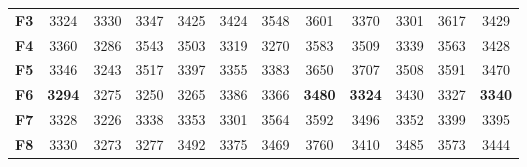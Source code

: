 \documentclass[runningheads]{llncs}
\begin{document}
\begin{table}[bt]
\begin{center}
\begin{tabular}{|l|c|c|c|c|c|c|c|c|c|c|c|}
      \textbf{F3}          & 3324                           & 3330                           & 3347                           & 3425 & 3424                           & 3548                           & 3601                           & 3370 & 3301                           & 3617 & 3429 \\
      \textbf{F4}          & 3360                           & 3286                           & 3543                           & 3503 & 3319                           & 3270                           & 3583                           & 3509 & 3339                           & 3563 & 3428 \\
      \textbf{F5}          & 3346                           & 3243                           & 3517                           & 3397 & 3355                           & 3383                           & 3650                           & 3707 & 3508                           & 3591 & 3470 \\
      \textbf{F6}          & \textbf{3294} & 3275                           & 3250                           & 3265 & 3386                           & 3366                           & \textbf{3480} & \textbf{3324} & 3430                           & 3327 & \textbf{3340} \\
      \textbf{F7}          & 3328                           & 3226                           & 3338                           & 3353 & 3301                           & 3564                           & 3592                           & 3496 & 3352                           & 3399 & 3395 \\
      
      \textbf{F8}          & 3330                           & 3273                           & 3277                           & 3492 & 3375                           & 3469                           & 3760                           & 3410 & 3485                           & 3573 & 3444 \\


\end{tabular}
\end{center}
\end{table}
\end{document}
